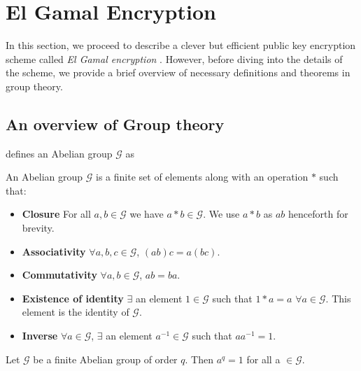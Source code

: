 \section{El Gamal Encryption}

\label{sec:elgamal} 

In this section, we proceed to describe a clever but efficient public key encryption scheme called \textit{El Gamal encryption} \cite{Elgamal_1985}. 
However, before diving into the details of the scheme, we provide a brief overview of necessary definitions and theorems in group theory.

\subsection{An overview of Group theory}

\cite{koocmsc} defines an Abelian group $ \mathcal{G} $ as

\begin{definition}
An Abelian group $ \mathcal{G} $ is a finite set of elements along with an operation $ * $ such that:

\begin{itemize}
    \item \textbf{Closure} For all $ a, b \in \mathcal{G} $ we have $ a * b \in \mathcal{G} $. We use $ a * b $ as $ ab $ henceforth for brevity.
    \item \textbf{Associativity} $ \forall a, b, c \in \mathcal{G} $, $ (ab)c = a(bc) $.
    \item \textbf{Commutativity} $ \forall a, b \in \mathcal{G} $, $ ab = ba $.
    \item \textbf{Existence of identity} $ \exists $ an element $ 1 \in \mathcal{G} $ such that $ 1 * a = a $ $ \forall a \in \mathcal{G} $. This element is the identity of $ \mathcal{G} $.
    \item \textbf{Inverse} $ \forall a \in \mathcal{G}$, $ \exists $ an element $ a^{-1} \in \mathcal{G} $ such that $ aa^{-1} = 1 $.
\end{itemize}
\end{definition}

\begin{theorem}
Let $\mathcal{G}$ be a finite Abelian group of order $ q $. Then $ a^q = 1 $ for all a $\in \mathcal{G}$.
\end{theorem}

